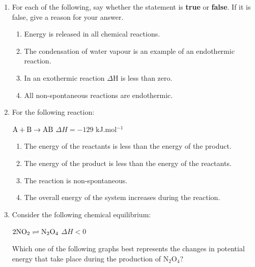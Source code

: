 \begin{eocexercises}{}

\begin{enumerate}
\item{For each of the following, say whether the statement is \textbf{true} or \textbf{false}. If it is false, give a reason for your answer.
\begin{enumerate}
\item{Energy is released in all chemical reactions.}
\item{The condensation of water vapour is an example of an endothermic reaction.}
\item{In an exothermic reaction $\Delta$H is less than zero.}
\item{All non-spontaneous reactions are endothermic.}
\end{enumerate}
}

\item{For the following reaction:

\begin{center}
$\rm{A + B \rightarrow AB}$ $\Delta H = -129$ kJ.mol$^{-1}$
\end{center}
}
\begin{enumerate}
\item{The energy of the reactants is less than the energy of the product.}
\item{The energy of the product is less than the energy of the reactants.}
\item{The reaction is non-spontaneous.}
\item{The overall energy of the system increases during the reaction.}
\end{enumerate}

\item{Consider the following chemical equilibrium:

\begin{center}
$\rm{2NO_{2} \rightleftharpoons N_{2}O_{4}}$  $\Delta H < 0$
\end{center}

Which one of the following graphs best represents the changes in potential energy that take place during the production of N$_{2}$O$_{4}$?}\\


\end{enumerate}
\end{eocexercises}
